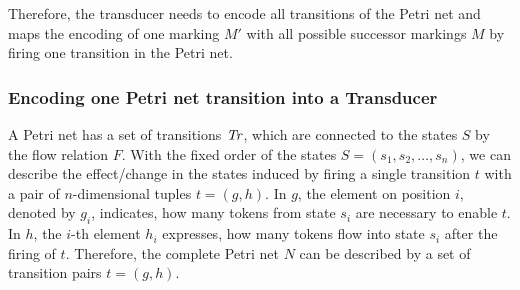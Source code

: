 

Therefore, the transducer needs to encode all transitions of the Petri net and maps the encoding of one marking $M'$ with all possible successor markings $M$ by firing one transition in the Petri net.


\subsubsection{Encoding one Petri net transition into a Transducer}
A Petri net has a set of transitions $\mathit{Tr}$, which are connected to the states $S$ by the flow relation $F$. 
With the fixed order of the states $S = (s_{1},s_{2},\dots,s_{n})$, we can describe the effect/change in the states induced by firing a single transition $t$ with a pair of $n$-dimensional tuples $t = (g,h)$. In $g$, the element on position $i$, denoted by $g_{i}$, indicates, how many tokens from state $s_{i}$ are necessary to enable $t$. In $h$, the $i$-th element $h_{i}$ expresses, how many tokens flow into state $s_{i}$ after the firing of $t$. Therefore, the complete Petri net $N$ can be described by a set of transition pairs $t = (g,h)$. 

% 
% 
%    
%
%
%
%
%
%


